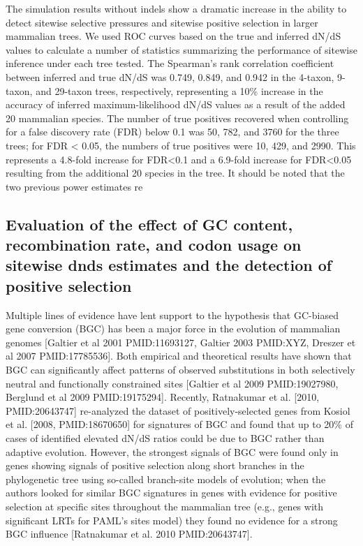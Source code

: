 The simulation results without indels show a dramatic increase in the
ability to detect sitewise selective pressures and sitewise positive
selection in larger mammalian trees. We used ROC curves based on the
true and inferred dN/dS values to calculate a number of statistics
summarizing the performance of sitewise inference under each tree
tested. The Spearman’s rank correlation coefficient between inferred
and true dN/dS was 0.749, 0.849, and 0.942 in the 4-taxon, 9-taxon,
and 29-taxon trees, respectively, representing a 10\% increase in the
accuracy of inferred maximum-likelihood dN/dS values as a result of
the added 20 mammalian species. The number of true positives recovered
when controlling for a false discovery rate (FDR) below 0.1 was 50,
782, and 3760 for the three trees; for FDR < 0.05, the numbers of true
positives were 10, 429, and 2990. This represents a 4.8-fold increase
for FDR<0.1 and a 6.9-fold increase for FDR<0.05 resulting from the
additional 20 species in the tree. It should be noted that the two
previous power estimates re

\subsection{Evaluation of the effect of GC content, recombination rate, and codon usage on sitewise dnds estimates and the detection of positive selection}


 Multiple lines of evidence have lent support to the hypothesis that
 GC-biased gene conversion (BGC) has been a major force in the
 evolution of mammalian genomes [Galtier et al 2001 PMID:11693127,
   Galtier 2003 PMID:XYZ, Dreszer et al 2007 PMID:17785536]. Both
 empirical and theoretical results have shown that BGC can
 significantly affect patterns of observed substitutions in both
 selectively neutral and functionally constrained sites [Galtier et al
   2009 PMID:19027980, Berglund et al 2009 PMID:19175294]. Recently,
 Ratnakumar et al. [2010, PMID:20643747] re-analyzed the dataset of
 positively-selected genes from Kosiol et al. [2008, PMID:18670650]
 for signatures of BGC and found that up to 20\% of cases of
 identified elevated dN/dS ratios could be due to BGC rather than
 adaptive evolution. However, the strongest signals of BGC were found
 only in genes showing signals of positive selection along short
 branches in the phylogenetic tree using so-called branch-site models
 of evolution; when the authors looked for similar BGC signatures in
 genes with evidence for positive selection at specific sites
 throughout the mammalian tree (e.g., genes with significant LRTs for
 PAML’s sites model) they found no evidence for a strong BGC influence
 [Ratnakumar et al. 2010 PMID:20643747].

